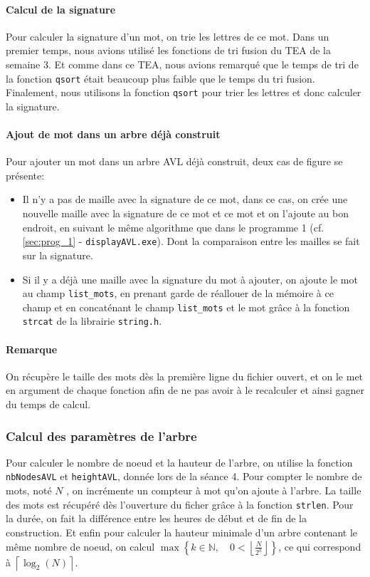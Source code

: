 \documentclass{article} %
\begin{document}
\paragraph{Calcul de la signature} Pour calculer la signature d'un mot, on trie les lettres de ce mot. Dans un premier temps, nous avions utilisé les fonctions de tri fusion du TEA de la semaine 3. Et comme dans ce TEA, nous avions remarqué que le temps de tri de la fonction \texttt{qsort} était beaucoup plus faible que le temps du tri fusion. Finalement, nous utilisons la fonction \texttt{qsort} pour trier les lettres et donc calculer la signature. 

\paragraph{Ajout de mot dans un arbre déjà construit} Pour ajouter un mot dans un arbre AVL déjà construit, deux cas de figure se présente: \begin{itemize}
  \item Il n'y a pas de maille avec la signature de ce mot, dans ce cas, on crée une nouvelle maille avec la signature de ce mot et ce mot et on l'ajoute au bon endroit, en suivant le même algorithme que dans le programme 1 (cf. \ref{sec:prog_1} - \texttt{displayAVL.exe}). Dont la comparaison entre les mailles se fait sur la signature. 
  \item Si il y a déjà une maille avec la signature du mot à ajouter, on ajoute le mot au champ \texttt{list\_mots}, en prenant garde de réallouer de la mémoire à ce champ et en concaténant le champ \texttt{list\_mots} et le mot grâce à la fonction \texttt{strcat} de la librairie \texttt{string.h}.
\end{itemize}

\paragraph{Remarque} On récupère le taille des mots dès la première ligne du fichier ouvert, et on le met en argument de chaque fonction afin de ne pas avoir à le recalculer et ainsi gagner du temps de calcul. 

\subsubsection{Calcul des paramètres de l'arbre}
Pour calculer le nombre de noeud et la hauteur de l'arbre, on utilise la fonction \texttt{nbNodesAVL} et \texttt{heightAVL}, donnée lors de la séance 4. Pour compter le nombre de mots, noté \(N\) , on incrémente un compteur à mot qu'on ajoute à l'arbre. La taille des mots est récupéré dès l'ouverture du ficher grâce à la fonction \texttt{strlen}. Pour la durée, on fait la différence entre les heures de début et de fin de la construction. Et enfin pour calculer la hauteur minimale d’un arbre contenant le même nombre de noeud, on calcul \(\displaystyle \max \left\lbrace k \in \mathbb{N}, \quad 0 < \left\lfloor  \frac{N}{2^k} \right\rfloor  \right\rbrace \), ce qui correspond à \(\left\lceil \log_2 (N) \right\rceil \). 
\end{document}
